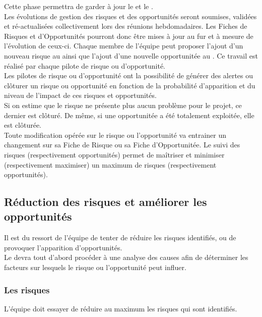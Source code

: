 Cette phase permettra de garder à jour le \PR{} et le \PO. \\

Les évolutions de gestion des risques et des opportunités seront soumises, validées et ré-actualisées collectivement lors des réunions hebdomadaires. Les Fiches de Risques et d'Opportunités pourront donc être mises à jour au fur et à mesure de l'évolution de ceux-ci. Chaque membre de l'équipe \PICCourt{} peut proposer l'ajout d'un nouveau risque au \PR{} ainsi que l'ajout d'une nouvelle opportunitée au \PO. Ce travail est réalisé par chaque pilote de risque ou d'opportunité.\\

Les pilotes de risque ou d’opportunité ont la possibilité de générer des alertes ou clôturer un risque ou opportunité en fonction de la probabilité d’apparition et du niveau de l’impact de ces risques et opportunités.\\

Si on estime que le risque ne présente plus aucun problème pour le projet, ce dernier est clôturé. De même, si une opportunitée a été totalement exploitée, elle est clôturée.\\

Toute modification opérée sur le risque ou l'opportunité va entrainer un changement sur sa Fiche de Risque ou sa Fiche d'Opportunitée. Le suivi des risques (respectivement opportunités) permet de maîtriser et minimiser (respectivement maximiser) un maximum de risques (respectivement opportunités). 

\subsection{Réduction des risques et améliorer les opportunités}
\label{reduction_risques_opportunitees}

Il est du ressort de l’équipe de tenter de réduire les risques identifiés, ou de provoquer l’apparition d’opportunités.\\

Le \PICCourt devra tout d’abord procéder à une analyse des causes afin de déterminer les facteurs sur lesquels le risque ou l’opportunité peut influer. \\

\subsubsection*{Les risques}

L'équipe \PICCourt doit essayer de réduire au maximum les risques qui sont identifiés. \\

